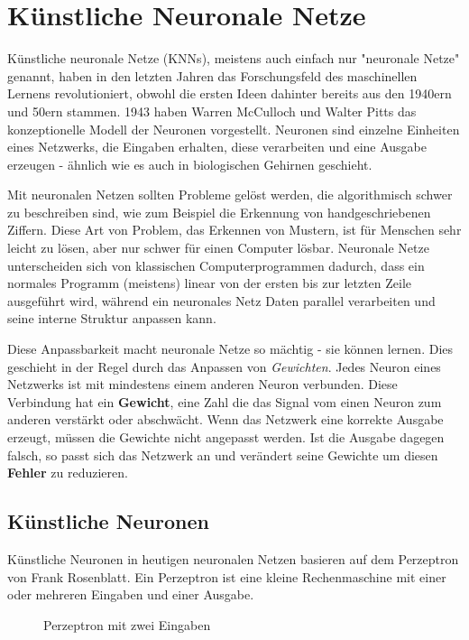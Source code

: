 \section{Künstliche Neuronale Netze}

Künstliche neuronale Netze (KNNs), meistens auch einfach nur "neuronale Netze" genannt, haben in den letzten Jahren das Forschungsfeld des maschinellen Lernens revolutioniert, obwohl die ersten Ideen dahinter bereits aus den 1940ern und 50ern stammen. 1943 haben Warren McCulloch und Walter Pitts das konzeptionelle Modell der Neuronen vorgestellt\cite{mccullochLogicalCalculusIdeas1943}. Neuronen sind einzelne Einheiten eines Netzwerks, die Eingaben erhalten, diese verarbeiten und eine Ausgabe erzeugen - ähnlich wie es auch in biologischen Gehirnen geschieht.
\par
Mit neuronalen Netzen sollten Probleme gelöst werden, die algorithmisch schwer zu beschreiben sind, wie zum Beispiel die Erkennung von handgeschriebenen Ziffern. Diese Art von Problem, das Erkennen von Mustern, ist für Menschen sehr leicht zu lösen, aber nur schwer für einen Computer lösbar. Neuronale Netze unterscheiden sich von klassischen Computerprogrammen dadurch, dass ein normales Programm (meistens) linear von der ersten bis zur letzten Zeile ausgeführt wird, während ein neuronales Netz Daten parallel verarbeiten und seine interne Struktur anpassen kann.
\par
Diese Anpassbarkeit macht neuronale Netze so mächtig - sie können lernen. Dies geschieht in der Regel durch das Anpassen von \textit{Gewichten}. Jedes Neuron eines Netzwerks ist mit mindestens einem anderen Neuron verbunden. Diese Verbindung hat ein \textbf{Gewicht}, eine Zahl die das Signal vom einen Neuron zum anderen verstärkt oder abschwächt. Wenn das Netzwerk eine korrekte Ausgabe erzeugt, müssen die Gewichte nicht angepasst werden. Ist die Ausgabe dagegen falsch, so passt sich das Netzwerk an und verändert seine Gewichte um diesen \textbf{Fehler} zu reduzieren.

\subsection{Künstliche Neuronen}
Künstliche Neuronen in heutigen neuronalen Netzen basieren auf dem Perzeptron von Frank Rosenblatt. Ein Perzeptron ist eine kleine Rechenmaschine mit einer oder mehreren Eingaben und einer Ausgabe.

\begin{figure}[!hbt]
	\centering
{}
\caption{Perzeptron mit zwei Eingaben}
\end{figure}


